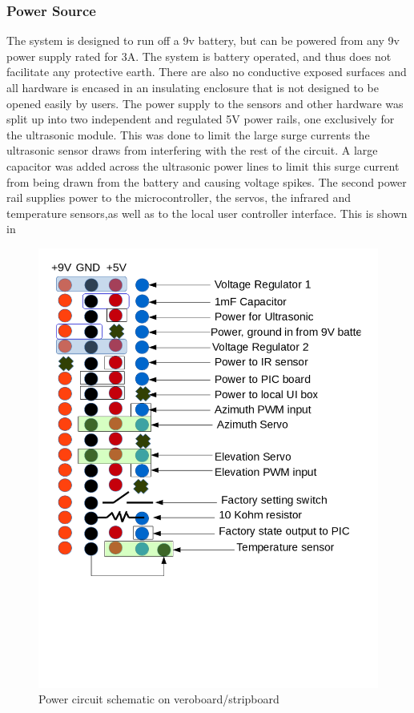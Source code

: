 \documentclass[]{report}
\begin{document}
\subsubsection{Power Source}
The system is designed to run off a 9v battery, but can be powered from any 9v power supply rated for 3A. The system is battery operated, and thus does not facilitate any protective earth. There are also no conductive exposed surfaces and all hardware is encased in an insulating enclosure that is not designed to be opened easily by users. \newline
The power supply to the sensors and other hardware was split up into two independent and regulated 5V power rails, one exclusively for the ultrasonic module. This was done to limit the large surge currents the ultrasonic sensor draws from interfering with the rest of the circuit. A large capacitor was added across the ultrasonic power lines to limit this surge current from being drawn from the battery and causing voltage spikes.\newline
The second power rail supplies power to the microcontroller, the servos, the infrared and temperature sensors,as well as to the local user controller interface. This is shown in \label{PowerBusDiagram}\newline

\begin{figure}
\centering
\includegraphics[width=0.7\linewidth]{"../Diagrams/PowerCircuit"}
\caption[State Diagram]{Power circuit schematic on veroboard/stripboard}
\label{fig:PowerBusDiagram}
\end{figure}
\end{document}
